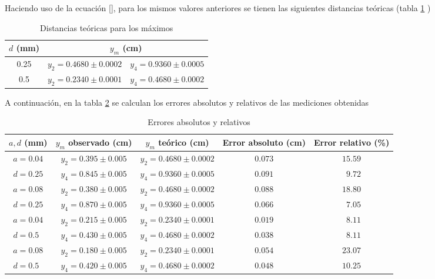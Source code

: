 \documentclass[12pt,a4paper]{article}
\begin{document}
  	Haciendo uso de la ecuación \ref{}, para los mismos valores anteriores se tienen las siguientes distancias teóricas (tabla \ref{tab:disteo} )
 	
 	\begin{table}[!htb]
 		\centering
 		\caption{Distancias teóricas para los máximos}
 		\begin{tabular}{|c|c|c|}
 			\hline
 			$ d $ (mm) & \multicolumn{2}{c|}{$ y_m $ (cm)}  \\
 			\hline
 			0.25 & $ y_2=0.4680\pm 0.0002 $ & $ y_4=0.9360\pm0.0005 $ \\
 			\hline
 			0.5 & $ y_2=0.2340\pm 0.0001 $ & $ y_4=0.4680\pm0.0002 $  \\
 			\hline
 		\end{tabular}
 		\label{tab:disteo}
 	\end{table}
 	
 	A continuación, en la tabla \ref{tab:errores} se calculan los errores absolutos y relativos de las mediciones obtenidas
 	
 	\begin{table}[!htb]
 		\centering
 		\caption{Errores absolutos y relativos}
 		\begin{tabular}{|c|c|c|c|c|}
 			\hline
 			$ a, d $ (mm) & $ y_m $ observado (cm) & $ y_m $ teórico (cm) & Error absoluto (cm) & Error relativo (\%)  \\
 			\hline
 			$ a=0.04 $          & $y_2=0.395\pm 0.005 $ & $y_2=0.4680\pm0.0002 $ & $ 0.073 $ & $ 15.59 $ \\ \cline{2-5}
 			$ d=0.25 $          & $y_4=0.845\pm 0.005 $ & $y_4=0.9360\pm0.0005 $ & $ 0.091 $ & $ \phantom{0}9.72 $ \\ \hline
 			$ a=0.08 $          & $y_2=0.380\pm 0.005 $ & $y_2=0.4680\pm0.0002 $ & $ 0.088 $ & $ 18.80 $ \\ \cline{2-5}
 			$ d=0.25 $          & $y_4=0.870\pm 0.005 $ & $y_4=0.9360\pm0.0005 $ & $ 0.066 $ & $ \phantom{0}7.05 $ \\ \hline
 			$ a=0.04 $          & $y_2=0.215\pm 0.005 $ & $y_2=0.2340\pm0.0001 $ & $ 0.019 $ & $ \phantom{0}8.11 $ \\ \cline{2-5}
 			$ d=0.5\phantom{0} $& $y_4=0.430\pm 0.005 $ & $y_4=0.4680\pm0.0002 $ & $ 0.038 $ & $ \phantom{0}8.11 $ \\ \hline
 			$ a=0.08 $          & $y_2=0.180\pm 0.005 $ & $y_2=0.2340\pm0.0001 $ & $ 0.054 $ & $ 23.07 $ \\ \cline{2-5}
 			$ d=0.5\phantom{0} $& $y_4=0.420\pm 0.005 $ & $y_4=0.4680\pm0.0002 $ & $ 0.048 $ & $ 10.25 $ \\ \hline
 		\end{tabular} 
 		\label{tab:errores}
 	\end{table}
 	 
\end{document}
